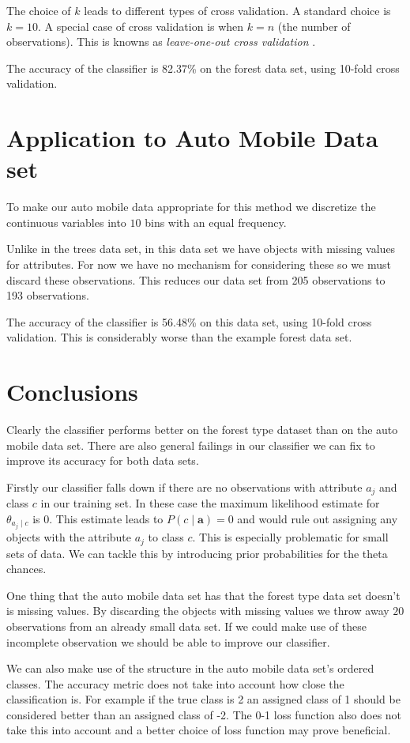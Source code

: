 The choice of $k$ leads to different types of cross validation.
A standard choice is $k=10$. A special case of cross validation is when $k=n$ (the number of observations).
This is knowns as \textit{leave-one-out cross validation} \cite{Priddy05}.

The accuracy of the classifier is 82.37\% on the forest data set, using 10-fold cross validation.

\section{Application to Auto Mobile Data set}

To make our auto mobile data appropriate for this method we discretize the continuous variables into $10$ bins with an equal frequency.

Unlike in the trees data set, in this data set we have objects with missing values for attributes.
For now we have no mechanism for considering these so we must discard these observations.
This reduces our data set from 205 observations to 193 observations.

The accuracy of the classifier is 56.48\% on this data set, using 10-fold cross validation.
This is considerably worse than the example forest data set.

\section{Conclusions}

Clearly the classifier performs better on the forest type dataset than on the auto mobile data set.
There are also general failings in our classifier we can fix to improve its accuracy for both data sets.

Firstly our classifier falls down if there are no observations with attribute $a_j$ and class $c$ in our training set. In these case the maximum likelihood estimate for $\theta_{a_j \mid c}$ is $0$.
This estimate leads to $P(c \mid \mathbf{a}) = 0$ and would rule out assigning any objects with the attribute $a_j$ to class $c$.
This is especially problematic for small sets of data.
We can tackle this by introducing prior probabilities for the theta chances.

One thing that the auto mobile data set has that the forest type data set doesn't is missing values.
By discarding the objects with missing values we throw away $20$ observations from an already small data set.
If we could make use of these incomplete observation we should be able to improve our classifier.

We can also make use of the structure in the auto mobile data set's ordered classes.
The accuracy metric does not take into account how close the classification is.
For example if the true class is 2 an assigned class of 1 should be considered better than an assigned class of -2.
The 0-1 loss function also does not take this into account and a better choice of loss function may prove beneficial.

